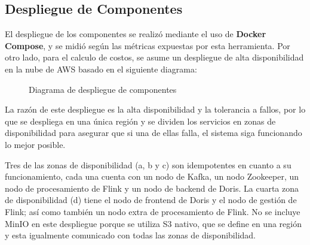 \clearpage

\subsection{Despliegue de Componentes}

El despliegue de los componentes se realizó mediante el uso de \textbf{Docker Compose}, y se midió según las métricas expuestas por esta herramienta.
Por otro lado, para el calculo de costos, se asume un despliegue de alta disponibilidad en la nube de AWS basado en el siguiente diagrama:

\begin{figure}[h]
    \caption{Diagrama de despliegue de componentes}
    \label{fig:infraestructura}
\end{figure}

\clearpage

La razón de este despliegue es la alta disponibilidad y la tolerancia a fallos, por lo que se despliega en una única región 
y se dividen los servicios en zonas de disponibilidad para asegurar que si una de ellas falla,
el sistema siga funcionando lo mejor posible.

Tres de las zonas de disponibilidad (a, b y c) son idempotentes en cuanto a su funcionamiento, 
cada una cuenta con un nodo de Kafka, un nodo Zookeeper, un nodo de procesamiento de Flink y un nodo de backend de Doris.
La cuarta zona de disponibilidad (d) tiene el nodo de frontend de Doris y el nodo de gestión de Flink; así como también un nodo extra de procesamiento de Flink.
No se incluye MinIO en este despliegue porque se utiliza S3 nativo, que se define en una región y esta igualmente comunicado con todas las zonas de disponibilidad.

